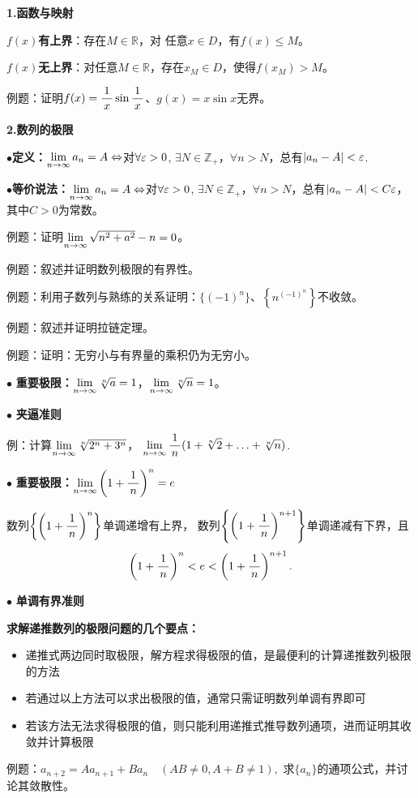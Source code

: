 {\bf 1.函数与映射}

{\bf $f(x)$有上界}：存在$M\in\mathbb{R}$，对
任意$x\in D$，有$f(x)\leq M$。

{\bf $f(x)$无上界}：对任意$M\in\mathbb{R}$，存在$x_M\in
D$，使得$f(x_M)>M$。

例题：证明$f(x)=\displaystyle\frac{\,{1}\,}{\,{x}\,}\sin\displaystyle\frac{\,{1}\,}{\,{x}\,}$、$g(x)=x\sin x$无界。

{\bf 2.数列的极限}

$\bullet${\bf 定义：}$\lim\limits_{n\to\infty} a_n=A\Leftrightarrow$对$\forall\varepsilon>0$,
$\exists N\in\mathbb{Z}_+$，$\forall n>N$，总有$|a_n-A|<\varepsilon$.

$\bullet${\bf 等价说法：}$\lim\limits_{n\to\infty} a_n=A\Leftrightarrow$对$\forall\varepsilon>0$,
$\exists N\in\mathbb{Z}_+$，$\forall n>N$，总有$|a_n-A|<C\varepsilon$，
其中$C>0$为常数。

例题：证明$\lim\limits_{n\to\infty}{\sqrt{n^2+a^2}-n}=0$。

例题：叙述并证明数列极限的有界性。

例题：利用子数列与熟练的关系证明：$\{(-1)^n\}$、$\left\{n^{(-1)^n}\right\}$不收敛。

例题：叙述并证明拉链定理。

例题：证明：无穷小与有界量的乘积仍为无穷小。

$\bullet$ {\bf 重要极限：}$\lim\limits_{n\to\infty}\sqrt[n]a=1$，$\lim\limits_{n\to\infty}\sqrt[n]n=1$。

$\bullet$ {\bf 夹逼准则}

例：计算$\lim\limits_{n\to\infty}\sqrt[n]{2^n+3^n}$，
$\lim\limits_{n\to\infty}\displaystyle\frac{\,{1}\,}{\,{n}\,}(1+\sqrt[n]2+\ldots+\sqrt[n]n)$.

$\bullet$ {\bf 重要极限：}$\lim\limits_{n\to\infty}\left(1+\displaystyle\frac{\,{1}\,}{\,{n}\,}\right)^n=e$

数列$\left\{\left(1+\displaystyle\frac{\,{1}\,}{\,{n}\,}\right)^n\right\}$单调递增有上界，
数列$\left\{\left(1+\displaystyle\frac{\,{1}\,}{\,{n}\,}\right)^{n+1}\right\}$单调递减有下界，且
$$\left(1+\displaystyle\frac{\,{1}\,}{\,{n}\,}\right)^n<e<\left(1+\displaystyle\frac{\,{1}\,}{\,{n}\,}\right)^{n+1}.$$

$\bullet$ {\bf 单调有界准则}

{\bf 求解递推数列的极限问题的几个要点：}
\begin{itemize}
  \setlength{\itemindent}{1cm}
  \item 递推式两边同时取极限，解方程求得极限的值，是最便利的计算递推数列极限的方法
  \item 若通过以上方法可以求出极限的值，通常只需证明数列单调有界即可
  \item 若该方法无法求得极限的值，则只能利用递推式推导数列通项，进而证明其收敛并计算极限
\end{itemize}

例题：$a_{n+2}=Aa_{n+1}+Ba_n\quad (AB\ne 0, A+B\ne 1),$
求$\{a_n\}$的通项公式，并讨论其敛散性。


